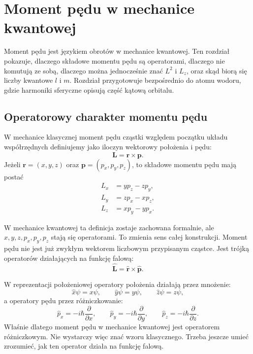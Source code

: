 \chapter{Moment pędu w mechanice kwantowej}

\begin{summarybox}
Moment pędu jest językiem obrotów w mechanice kwantowej. Ten rozdział pokazuje,
dlaczego składowe momentu pędu są operatorami, dlaczego nie komutują ze sobą,
dlaczego można jednocześnie znać \(L^2\) i \(L_z\), oraz skąd biorą się liczby
kwantowe \(l\) i \(m\). Rozdział przygotowuje bezpośrednio do atomu wodoru,
gdzie harmoniki sferyczne opisują część kątową orbitalu.
\end{summarybox}

\section{Operatorowy charakter momentu pędu}

W mechanice klasycznej moment pędu cząstki względem początku układu współrzędnych definiujemy jako iloczyn wektorowy położenia i pędu:
\[
    \mathbf{L}=\mathbf{r}\times\mathbf{p}.
\]
Jeżeli \(\mathbf{r}=(x,y,z)\) oraz \(\mathbf{p}=(p_x,p_y,p_z)\), to składowe momentu pędu mają postać
\begin{align}
    L_x &= y p_z-z p_y, \\
    L_y &= z p_x-x p_z, \\
    L_z &= x p_y-y p_x.
\end{align}

W mechanice kwantowej ta definicja zostaje zachowana formalnie, ale \(x,y,z,p_x,p_y,p_z\) stają się operatorami. To zmienia sens całej konstrukcji. Moment pędu nie jest już zwykłym wektorem liczbowym przypisanym cząstce. Jest trójką operatorów działających na funkcję falową:
\[
    \hat{\mathbf{L}}=\hat{\mathbf{r}}\times\hat{\mathbf{p}}.
\]

W reprezentacji położeniowej operatory położenia działają przez mnożenie:
\[
    \hat{x}\psi=x\psi,
    \qquad
    \hat{y}\psi=y\psi,
    \qquad
    \hat{z}\psi=z\psi,
\]
a operatory pędu przez różniczkowanie:
\[
    \hat{p}_x=-i\hbar\frac{\partial}{\partial x},
    \qquad
    \hat{p}_y=-i\hbar\frac{\partial}{\partial y},
    \qquad
    \hat{p}_z=-i\hbar\frac{\partial}{\partial z}.
\]
Właśnie dlatego moment pędu w mechanice kwantowej jest operatorem różniczkowym. Nie wystarczy więc znać wzoru klasycznego. Trzeba jeszcze umieć zrozumieć, jak ten operator działa na funkcję falową.

